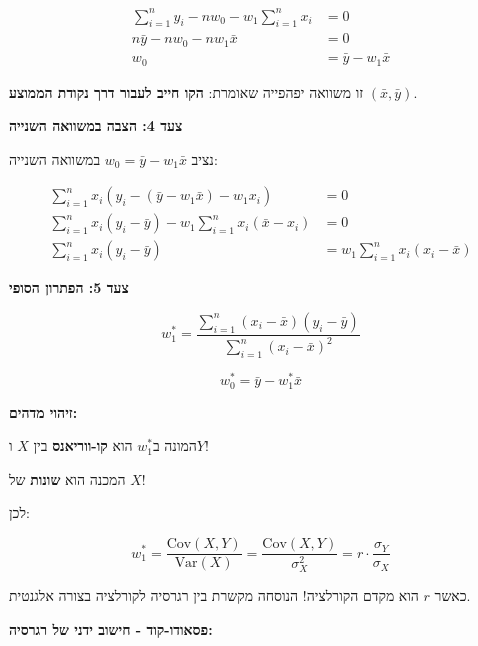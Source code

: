 \begin{align}
\sum_{i=1}^{n} y_i - n w_0 - w_1 \sum_{i=1}^{n} x_i &= 0 \nonumber \\
n \bar{y} - n w_0 - n w_1 \bar{x} &= 0 \nonumber \\
w_0 &= \bar{y} - w_1 \bar{x}
\end{align}

זו משוואה יפהפייה שאומרת: \textbf{הקו חייב לעבור דרך נקודת הממוצע} $(\bar{x}, \bar{y})$.

\textbf{צעד \num{4}: הצבה במשוואה השנייה}

נציב $w_0 = \bar{y} - w_1 \bar{x}$ במשוואה השנייה:

\begin{align}
\sum_{i=1}^{n} x_i(y_i - (\bar{y} - w_1 \bar{x}) - w_1 x_i) &= 0 \nonumber \\
\sum_{i=1}^{n} x_i(y_i - \bar{y}) - w_1 \sum_{i=1}^{n} x_i(\bar{x} - x_i) &= 0 \nonumber \\
\sum_{i=1}^{n} x_i(y_i - \bar{y}) &= w_1 \sum_{i=1}^{n} x_i(x_i - \bar{x})
\end{align}

\textbf{צעד \num{5}: הפתרון הסופי}

\begin{equation}
w_1^* = \frac{\sum_{i=1}^{n} (x_i - \bar{x})(y_i - \bar{y})}{\sum_{i=1}^{n} (x_i - \bar{x})^2}
\end{equation}

\begin{equation}
w_0^* = \bar{y} - w_1^* \bar{x}
\end{equation}

\textbf{זיהוי מדהים:}

המונה ב\en{-}$w_1^*$ הוא \textbf{קו-ווריאנס} בין $X$ ו\en{-}$Y$!

המכנה הוא \textbf{שונות} של $X$!

לכן:

\begin{equation}
w_1^* = \frac{\text{Cov}(X, Y)}{\text{Var}(X)} = \frac{\text{Cov}(X, Y)}{\sigma_X^2} = r \cdot \frac{\sigma_Y}{\sigma_X}
\end{equation}

כאשר $r$ הוא מקדם הקורלציה! הנוסחה מקשרת בין רגרסיה לקורלציה בצורה אלגנטית.

\textbf{פסאודו-קוד - חישוב ידני של רגרסיה:}


